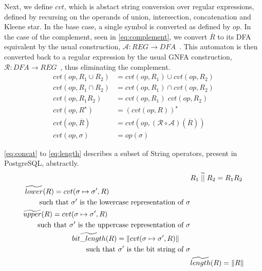 Next, we define $cvt$, which is abstact string conversion over regular expressions, defined by recursing on the operands of union, intersection, concatenation and Kleene star.
In the base case, a single symbol is converted as defined by $op$.
In the case of the complement, seen in \autoref{eq:complement}, we convert $\overline{R}$ to its DFA equivalent by the usual construction, $\mathcal{A}:REG\rightarrow DFA$~\cite{sipserbook}.
This automaton is then converted back to a regular expression by the usual GNFA construction, $\mathcal{R}: DFA\rightarrow REG$~\cite{sipserbook}, thus eliminating the complement.
\begin{align}
    cvt(op, R_1 \cup R_2) &= cvt(op, R_1) \cup cvt(op, R_2) \\
    cvt(op, R_1 \cap R_2) &= cvt(op, R_1) \cap cvt(op, R_2) \\
    cvt(op, R_1R_2) &= cvt(op, R_1) \; cvt(op, R_2) \\
    cvt(op, R^\star) &= (cvt(op, R))^\star \\
    cvt(op, \overline{R}) &= cvt(op, (\mathcal{R} \circ \mathcal{A}) (\overline{R})) \label{eq:complement} \\
    cvt(op, \sigma) &= op(\sigma)
\end{align}

\autoref{eq:concat} to \ref{eq:length} describes a subset of String operators, present in PostgreSQL, abstractly.
\begin{align}\label{eq:concat}
    &R_1 \;\aab{||}\; R_2 = R_1R_2 \\
    \begin{split}
        &\aab{lower}(R) = cvt(\sigma \mapsto \sigma', R) \\
        & \quad \quad \text{such } \text{that } \sigma' \text{ is the lowercase representation of } \sigma
    \end{split}\\
    \begin{split}
        & \aab{upper}(R) = cvt(\sigma \mapsto \sigma', R) \\
        & \quad \quad \text{such } \text{that $\sigma'$ is the uppercase representation of $\sigma$}
    \end{split}\\
    \begin{split}
        &\aab{bit\_length}(R) = \|cvt(\sigma \mapsto \sigma', R)\| \\
        & \quad \quad \text{such } \text{that $\sigma'$ is the bit string of $\sigma$}
    \end{split} \\ \label{eq:length}
    &\aab{length}(R) = \|R\|
\end{align}

